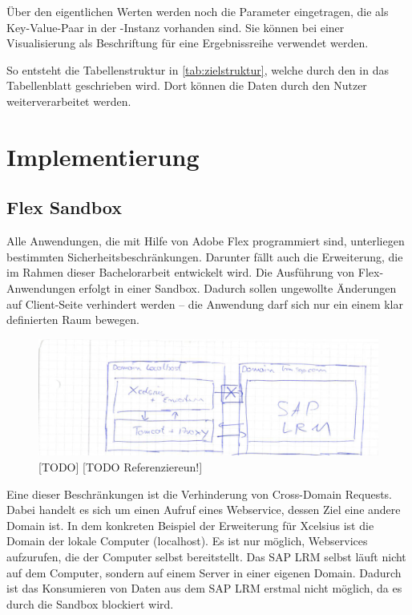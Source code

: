 \begin{onehalfspacing}
Über den eigentlichen Werten werden noch die Parameter eingetragen, die als Key-Value-Paar in der -Instanz vorhanden sind. Sie können bei einer Visualisierung als Beschriftung für eine Ergebnissreihe verwendet werden.

So entsteht die Tabellenstruktur in \vref{tab:zielstruktur}, welche durch den  in das Tabellenblatt geschrieben wird. Dort können die Daten durch den Nutzer weiterverarbeitet werden.

\section{Implementierung}
\subsection{Flex Sandbox}
Alle Anwendungen, die mit Hilfe von Adobe Flex programmiert sind, unterliegen bestimmten Sicherheitsbeschränkungen. Darunter fällt auch die Erweiterung, die im Rahmen dieser Bachelorarbeit entwickelt wird. Die Ausführung von Flex-Anwendungen erfolgt in einer Sandbox. Dadurch sollen ungewollte Änderungen auf Client-Seite verhindert werden -- die Anwendung darf sich nur ein einem klar definierten Raum bewegen.

\begin{figure}[h]
\centering
\setlength{\unitlength}{1mm}
\includegraphics[width=15cm]{images/flex_sandbox.png}
\caption{[TODO] [TODO Referenziereun!] \label{[TODO]}}
\end{figure}

Eine dieser Beschränkungen ist die Verhinderung von Cross-Domain Requests. Dabei handelt es sich um einen Aufruf eines Webservice, dessen Ziel eine andere Domain ist. In dem konkreten Beispiel der Erweiterung für Xcelsius ist die Domain der lokale Computer (localhost). Es ist nur möglich, Webservices aufzurufen, die der Computer selbst bereitstellt. Das SAP LRM selbst läuft nicht auf dem Computer, sondern auf einem Server in einer eigenen Domain. Dadurch ist das Konsumieren von Daten aus dem SAP LRM erstmal nicht möglich, da es durch die Sandbox blockiert wird.


\end{onehalfspacing}
